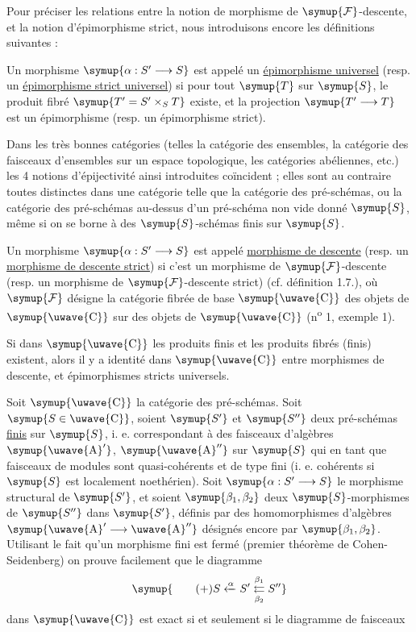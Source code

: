 Pour préciser les relations entre la notion de morphisme de
$\symup{\mathcal F}$-descente, et la notion d'épimorphisme strict, nous introduisons
encore les définitions suivantes :

 Un morphisme $\symup{\alpha:S'\longrightarrow S}$ est appelé
un \uline{épimorphisme universel} (resp. un \uline{épimorphisme strict universel})
si pour tout $\symup{T}$ sur $\symup{S}$, le produit fibré $\symup{T'=S'\times_ST}$ existe, et la
projection $\symup{T'\longrightarrow T}$ est un épimorphisme (resp. un épimorphisme
strict).

Dans les très bonnes catégories (telles la catégorie des ensembles, la
catégorie des faisceaux d'ensembles sur un espace topologique, les catégories
abéliennes, etc.) les 4 notions d'épijectivité ainsi introduites
coïncident ; elles sont au contraire toutes distinctes dans une catégorie telle
que la catégorie des pré-schémas, ou la catégorie des pré-schémas au-dessus d'un
pré-schéma non vide donné $\symup{S}$, même si on se borne à des $\symup{S}$-schémas finis sur
$\symup{S}$.

 Un morphisme $\symup{\alpha:S'\longrightarrow S}$ est appelé
\uline{morphisme de descente} (resp. un \uline{morphisme de descente strict}) si
c'est un morphisme de $\symup{\mathcal F}$-descente (resp. un morphisme de
$\symup{\mathcal F}$-descente strict) (cf. définition 1.7.), où $\symup{\mathcal F}$ désigne la
catégorie fibrée de base $\symup{\text{\uwave{C}}}$ des objets de $\symup{\text{\uwave{C}}}$ sur des objets
de $\symup{\text{\uwave{C}}}$ (n\textsuperscript{o} 1, exemple 1).

 Si dans $\symup{\text{\uwave{C}}}$ les produits finis et les
produits fibrés (finis) existent, alors il y a identité dans $\symup{\text{\uwave{C}}}$ entre
morphismes de descente, et épimorphismes stricts universels.

 Soit $\symup{\text{\uwave{C}}}$ la catégorie des pré-schémas. Soit
$\symup{S\in\text{\uwave{C}}}$, soient $\symup{S'}$ et $\symup{S''}$ deux pré-schémas \uline{finis} sur $\symup{S}$, i. e.
correspondant à des faisceaux d'algèbres $\symup{\text{\uwave{A}}'}$, $\symup{\text{\uwave{A}}''}$ sur $\symup{S}$
qui en tant que faisceaux de modules sont quasi-cohérents et de type fini
(i. e. cohérents si $\symup{S}$ est localement noethérien). Soit
$\symup{\alpha:S'\longrightarrow S}$ le morphisme structural de $\symup{S'}$, et soient
$\symup{\beta_1,\beta_2}$ deux $\symup{S}$-morphismes de $\symup{S''}$ dans $\symup{S'}$, définis par des
homomorphismes d'algèbres $\symup{\text{\uwave{A}}'\longrightarrow\text{\uwave{A}}''}$ désignés
encore par $\symup{\beta_1,\beta_2}$. Utilisant le fait qu'un morphisme fini est fermé
(premier théorème de Cohen-Seidenberg) on prouve facilement que le diagramme
\[
  \symup{\tag{+}
  S\xleftarrow{\alpha}S'
  \overset{\beta_1}{\underset{\beta_2}{\leftleftarrows}}S''}
\]
dans $\symup{\text{\uwave{C}}}$ est exact si et seulement si le diagramme de faisceaux

